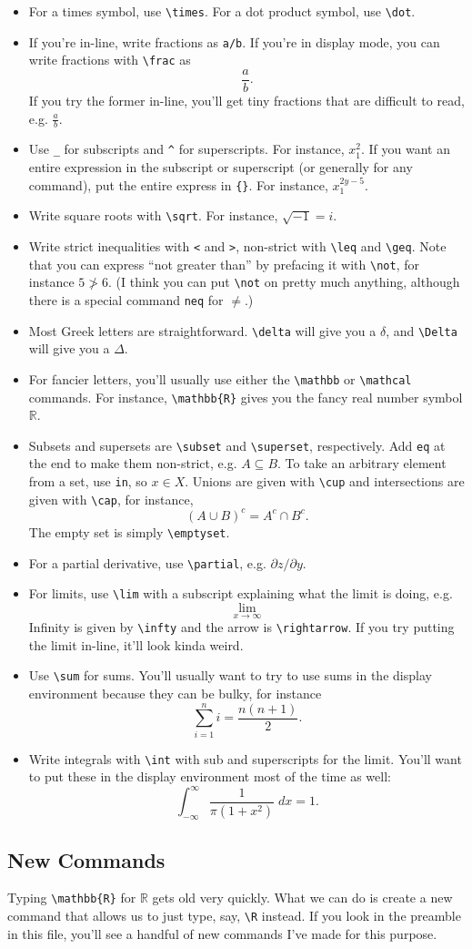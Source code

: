 \documentclass[12pt]{article}
\newcommand{\R}{\mathbb{R}}
\begin{document}
	\begin{itemize}
		\item For a times symbol, use \verb|\times|. For a dot product symbol, use \verb|\dot|. 
		\item If you're in-line, write fractions as \verb|a/b|. If you're in display mode, you can write fractions with \verb|\frac| as \[ \frac{a}{b}. \]
		If you try the former in-line, you'll get tiny fractions that are difficult to read, e.g. $\frac{a}{b}$. 
		\item Use \verb|_| for subscripts and \verb|^| for superscripts. For instance, $x_1^2$. If you want an entire expression in the subscript or superscript (or generally for any command), put the entire express in \verb|{}|. For instance, $x_1^{2y-5}$. 
		\item Write square roots with \verb|\sqrt|. For instance, $\sqrt{-1}=i$. 
		\item Write strict inequalities with \verb|<| and \verb|>|, non-strict with \verb|\leq| and \verb|\geq|. Note that you can express ``not greater than'' by prefacing it with  \verb|\not|, for instance $5 \not > 6$. (I think you can put \verb|\not| on pretty much anything, although there is a special command \verb|neq| for $\neq$.)
		\item Most Greek letters are straightforward. \verb|\delta| will give you a $\delta$, and \verb|\Delta| will give you a $\Delta$. 
		\item For fancier letters, you'll usually use either the \verb|\mathbb| or \verb|\mathcal| commands. For instance, \verb|\mathbb{R}| gives you the fancy real number symbol $\mathbb{R}$.
		\item Subsets and supersets are \verb|\subset| and \verb|\superset|, respectively. Add \verb|eq| at the end to make them non-strict, e.g. $A \subseteq B$. To take an arbitrary element from a set, use \verb|in|, so $x \in X$. Unions are given with \verb|\cup| and intersections are given with \verb|\cap|, for instance,  
			\[	(A \cup B)^c=A^c \cap B^c . \]
		The empty set is simply \verb|\emptyset|. 
		\item For a partial derivative, use \verb|\partial|, e.g. $\partial z/\partial y$. 
		\item For limits, use \verb|\lim| with a subscript explaining what the limit is doing, e.g.
			\[ \lim_{x \rightarrow \infty}  \]
			Infinity is given by \verb|\infty| and  the arrow is \verb|\rightarrow|. If you try putting the limit in-line, it'll look kinda weird. 
		\item Use \verb|\sum| for sums. You'll usually want to try to use sums in the display environment because they can be bulky, for instance
			\[\sum_{i=1}^n i = \frac{n(n+1)}{2}.\]
		\item Write integrals with \verb|\int| with sub and superscripts for the limit. You'll want to put these in the display environment most of the time as well:
			\[ \int_{-\infty}^{\infty} \frac{1}{\pi(1+x^2)} \; dx = 1 .\]
	\end{itemize}

	
	\subsection{New Commands}
	
	Typing \verb|\mathbb{R}| for $\mathbb{R}$ gets old very quickly. What we can do is create a new command that allows us to just type, say, \verb|\R| instead. If you look in the preamble in this file, you'll see a handful of new commands I've made for this purpose. 
	
\end{document}
